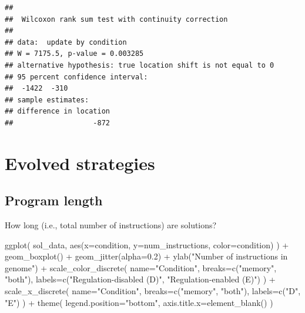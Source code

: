 \documentclass[
]{book}
\newenvironment{Shaded}{\begin{snugshade}}{\end{snugshade}}
\newcommand{\AttributeTok}[1]{\textcolor[rgb]{0.77,0.63,0.00}{#1}}
\newcommand{\FloatTok}[1]{\textcolor[rgb]{0.00,0.00,0.81}{#1}}
\newcommand{\FunctionTok}[1]{\textcolor[rgb]{0.00,0.00,0.00}{#1}}
\newcommand{\NormalTok}[1]{#1}
\newcommand{\SpecialCharTok}[1]{\textcolor[rgb]{0.00,0.00,0.00}{#1}}
\newcommand{\StringTok}[1]{\textcolor[rgb]{0.31,0.60,0.02}{#1}}
\begin{document}
\begin{verbatim}
## 
##  Wilcoxon rank sum test with continuity correction
## 
## data:  update by condition
## W = 7175.5, p-value = 0.003285
## alternative hypothesis: true location shift is not equal to 0
## 95 percent confidence interval:
##  -1422  -310
## sample estimates:
## difference in location 
##                   -872
\end{verbatim}

\hypertarget{evolved-strategies-2}{%
\section{Evolved strategies}\label{evolved-strategies-2}}

\hypertarget{program-length-3}{%
\subsection{Program length}\label{program-length-3}}

How long (i.e., total number of instructions) are solutions?

\begin{Shaded}
\begin{Highlighting}[]
\FunctionTok{ggplot}\NormalTok{( sol\_data, }\FunctionTok{aes}\NormalTok{(}\AttributeTok{x=}\NormalTok{condition, }\AttributeTok{y=}\NormalTok{num\_instructions, }\AttributeTok{color=}\NormalTok{condition) ) }\SpecialCharTok{+}
  \FunctionTok{geom\_boxplot}\NormalTok{() }\SpecialCharTok{+}
  \FunctionTok{geom\_jitter}\NormalTok{(}\AttributeTok{alpha=}\FloatTok{0.2}\NormalTok{) }\SpecialCharTok{+}
  \FunctionTok{ylab}\NormalTok{(}\StringTok{"Number of instructions in genome"}\NormalTok{) }\SpecialCharTok{+}
  \FunctionTok{scale\_color\_discrete}\NormalTok{(}
    \AttributeTok{name=}\StringTok{"Condition"}\NormalTok{,}
    \AttributeTok{breaks=}\FunctionTok{c}\NormalTok{(}\StringTok{"memory"}\NormalTok{, }\StringTok{"both"}\NormalTok{),}
    \AttributeTok{labels=}\FunctionTok{c}\NormalTok{(}\StringTok{"Regulation{-}disabled (D)"}\NormalTok{, }\StringTok{"Regulation{-}enabled (E)"}\NormalTok{)}
\NormalTok{  ) }\SpecialCharTok{+}
  \FunctionTok{scale\_x\_discrete}\NormalTok{(}
    \AttributeTok{name=}\StringTok{"Condition"}\NormalTok{,}
    \AttributeTok{breaks=}\FunctionTok{c}\NormalTok{(}\StringTok{"memory"}\NormalTok{, }\StringTok{"both"}\NormalTok{),}
    \AttributeTok{labels=}\FunctionTok{c}\NormalTok{(}\StringTok{"D"}\NormalTok{, }\StringTok{"E"}\NormalTok{)}
\NormalTok{  ) }\SpecialCharTok{+}
  \FunctionTok{theme}\NormalTok{(}
    \AttributeTok{legend.position=}\StringTok{"bottom"}\NormalTok{,}
    \AttributeTok{axis.title.x=}\FunctionTok{element\_blank}\NormalTok{()}
\NormalTok{  )}
\end{Highlighting}
\end{Shaded}
\end{document}

